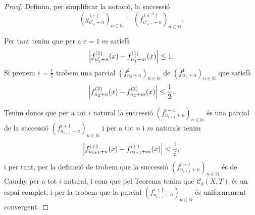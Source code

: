 \documentclass[../Apunts.tex]{subfiles}
\begin{document}
\begin{lemma}
\begin{proof}
			Definim, per simplificar la notació, la successió
			\[\left(g^{(\varepsilon)}_{n'_{\varepsilon}+n}\right)_{n\in\mathbb{N}}=\left(f^{(\varepsilon^{-1})}_{n'_{\varepsilon^{-1}}+n}\right)_{n\in\mathbb{N}}.\]
			
			Per tant tenim que per a \(\varepsilon=1\) es satisfà
			\[\norm{f^{(1)}_{n'_{1}+n}(x)-f^{(1)}_{n'_{1}+m}(x)}\leq1.\]
			Si prenem \(\varepsilon=\frac{1}{2}\) trobem una parcial \((f^{2}_{n_{2}+n})_{n\in\mathbb{N}}\) de \((f^{1}_{n_{1}+n})_{n\in\mathbb{N}}\) que satisfà
			\[\norm{f^{(2)}_{n_{2}+n}(x)-f^{(2)}_{n_{2}+m}(x)}\leq\frac{1}{2}.\]
			
			Tenim doncs que per a tot \(i\) natural la successió \((f^{i+1}_{n_{i+1}+n})_{n\in\mathbb{N}}\) és una parcial de la successió \((f^{i+1}_{n_{i+1}+n})_{n\in\mathbb{N}}\) i per a tot \(n\) i \(m\) naturals tenim
			\[\norm{f^{i+1}_{n_{i+1}+n}(x)-f^{i+1}_{n_{i+1}+m}(x)}<\frac{1}{i},\]
			i per tant, per la definició de  trobem que la successió \((f^{i+1}_{n_{i+1}+n})_{n\in\mathbb{N}}\) és de Cauchy per a tot \(i\) natural, i com que pel Teorema  tenim que \(\mathcal{C}_{b}(X,T)\) és un espai complet, i per la  trobem que la parcial \((f^{i+1}_{n_{i+1}+n})_{n\in\mathbb{N}}\) és uniformement convergent.
		\end{proof}
	\end{lemma}
\end{document}
